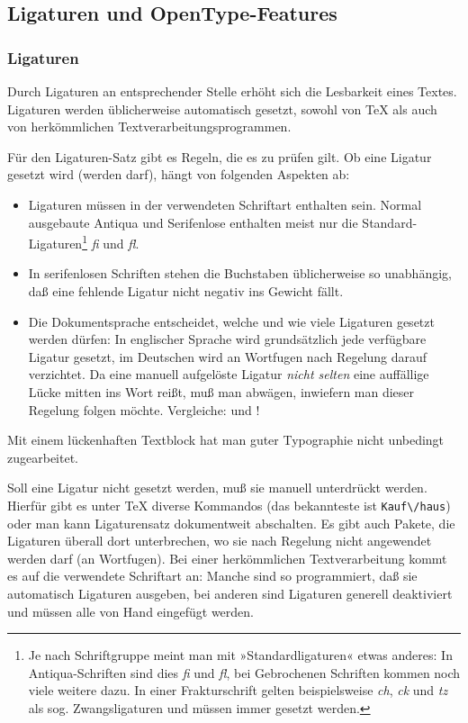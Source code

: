 \documentclass[11pt,a4paper,ngerman,DIV=8]{scrartcl}
\begin{document}
\subsection{Ligaturen und OpenType-Features}

\subsubsection{Ligaturen}

Durch Ligaturen an entsprechender Stelle erhöht sich die Lesbarkeit eines Textes. Ligaturen werden üblicherweise automatisch gesetzt, sowohl von \TeX{} als auch von herkömmlichen Textverarbeitungsprogrammen.

Für den Ligaturen-Satz gibt es Regeln, die es zu prüfen gilt. Ob eine Ligatur gesetzt wird (werden darf), hängt von folgenden Aspekten ab:

\begin{itemize}
  \item Ligaturen müssen in der verwendeten Schriftart enthalten sein. Normal ausgebaute Antiqua und Serifenlose enthalten meist nur die Standard-Ligaturen\footnote{Je nach Schriftgruppe meint man mit »Standardligaturen« etwas anderes: In Antiqua-Schriften sind dies \emph{fi} und \emph{fl}, bei Gebrochenen Schriften kommen noch viele weitere dazu. In einer Frakturschrift gelten beispielsweise \emph{ch}, \emph{ck} und \emph{tz} als sog. Zwangsligaturen und müssen immer gesetzt werden.} \emph{fi} und \emph{fl}.
  \item In serifenlosen Schriften stehen die Buchstaben üblicherweise so unabhängig, daß eine fehlende Ligatur nicht negativ ins Gewicht fällt.
  \item Die Dokumentsprache entscheidet, welche und wie viele Ligaturen gesetzt werden dürfen: In englischer Sprache wird grundsätzlich jede verfügbare Ligatur gesetzt, im Deutschen wird an Wortfugen nach Regelung darauf verzichtet. Da eine manuell aufgelöste Ligatur \emph{nicht selten} eine auffällige Lücke mitten ins Wort reißt, muß man abwägen, inwiefern man dieser Regelung folgen möchte. Vergleiche:  und  !
\end{itemize}
Mit einem lückenhaften Textblock hat man guter Typographie nicht unbedingt zugearbeitet.

Soll eine Ligatur nicht gesetzt werden, muß sie manuell unterdrückt werden. Hierfür gibt es unter \TeX{} diverse Kommandos (das bekannteste ist \texttt{Kauf\textbackslash/haus}) oder man kann Ligaturensatz dokumentweit abschalten. Es gibt auch Pakete, die Ligaturen überall dort unterbrechen, wo sie nach Regelung nicht angewendet werden darf (an Wortfugen). Bei einer herkömmlichen Textverarbeitung kommt es auf die verwendete Schriftart an: Manche sind so programmiert, daß sie automatisch Ligaturen ausgeben, bei anderen sind Ligaturen generell deaktiviert und müssen alle von Hand eingefügt werden.
\end{document}
